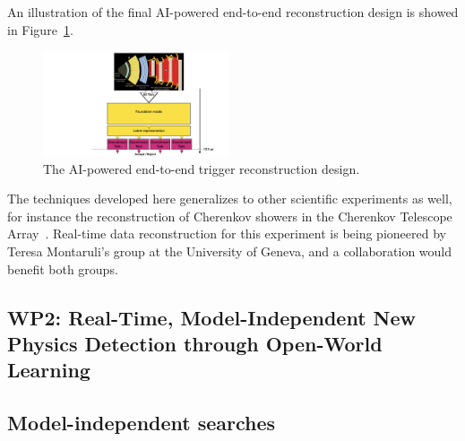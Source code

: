 \documentclass[12pt]{iopart}
\begin{document}
An illustration of the final AI-powered end-to-end reconstruction design is showed in Figure~\ref{fig:e2e}.

\begin{figure}[t!]
    \centering
    \includegraphics[width=0.49\textwidth]{figures/mlpf_foundation.pdf}
    \caption{The AI-powered end-to-end trigger reconstruction design.}
    \label{fig:e2e}
\end{figure}

The techniques developed here generalizes to other scientific experiments as well, for instance the reconstruction of Cherenkov showers in the Cherenkov Telescope Array~\cite{CTAObservatory2024}. Real-time data reconstruction for this experiment is being pioneered by Teresa Montaruli's group at the University of Geneva, and a collaboration would benefit both groups.


\subsection{WP2: Real-Time, Model-Independent New Physics Detection through Open-World Learning}

\subsection{Model-independent searches}

\end{document}
